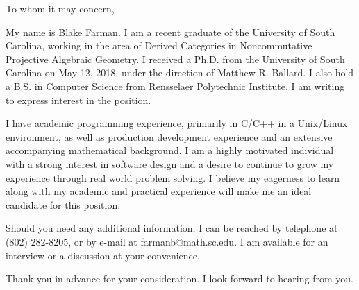 \documentclass{letter}
\begin{document}
\newcommand{\loc}{MathJobs}
\newcommand{\posting}{ position}
\newcommand{\employer}{}

\def\materials{}
\begin{letter}{\employer}
  \opening{To whom it may concern,}
  
  My name is Blake Farman.
  I am a recent graduate of the University of South Carolina, working in the area of Derived Categories in Noncommutative Projective Algebraic Geometry.
  I received a Ph.D. from the University of South Carolina on May 12, 2018, under the direction of Matthew R. Ballard.
  I also hold a B.S. in Computer Science from Rensselaer Polytechnic Institute.
  I am writing to express interest in the \posting.

  I have academic programming experience, primarily in C/C++ in a Unix/Linux environment, as well as production development experience and an extensive accompanying mathematical background.
  I am a highly motivated individual with a strong interest in software design and a desire to continue to grow my experience through real world problem solving.  
  I believe my eagerness to learn along with my academic and practical experience will make me an ideal candidate for this position.

  Should you need any additional information, I can be reached by telephone at (802) 282-8205, or by e-mail at farmanb@math.sc.edu.  
  I am available for an interview or a discussion at your convenience.  
  
  Thank you in advance for your consideration.
  I look forward to hearing from you.
  


\end{letter}
\end{document}
